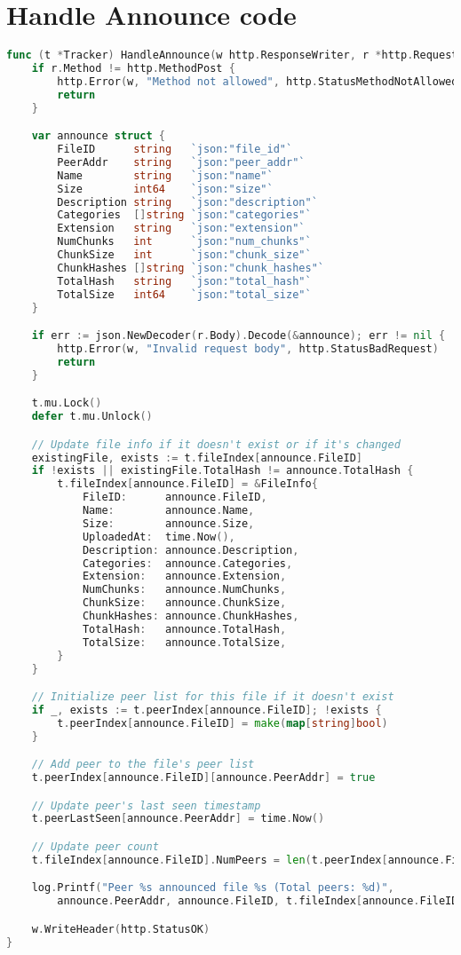 \documentclass[12pt,a4paper]{report}
\begin{document}
\section{Handle Announce code}
\begin{lstlisting}[language=Go, caption={Peer announce implementation}, label={lst:handle-announce}]
  func (t *Tracker) HandleAnnounce(w http.ResponseWriter, r *http.Request) {
    if r.Method != http.MethodPost {
        http.Error(w, "Method not allowed", http.StatusMethodNotAllowed)
        return
    }

    var announce struct {
        FileID      string   `json:"file_id"`
        PeerAddr    string   `json:"peer_addr"`
        Name        string   `json:"name"`
        Size        int64    `json:"size"`
        Description string   `json:"description"`
        Categories  []string `json:"categories"`
        Extension   string   `json:"extension"`
        NumChunks   int      `json:"num_chunks"`
        ChunkSize   int      `json:"chunk_size"`
        ChunkHashes []string `json:"chunk_hashes"`
        TotalHash   string   `json:"total_hash"`
        TotalSize   int64    `json:"total_size"`
    }

    if err := json.NewDecoder(r.Body).Decode(&announce); err != nil {
        http.Error(w, "Invalid request body", http.StatusBadRequest)
        return
    }

    t.mu.Lock()
    defer t.mu.Unlock()

    // Update file info if it doesn't exist or if it's changed
    existingFile, exists := t.fileIndex[announce.FileID]
    if !exists || existingFile.TotalHash != announce.TotalHash {
        t.fileIndex[announce.FileID] = &FileInfo{
            FileID:      announce.FileID,
            Name:        announce.Name,
            Size:        announce.Size,
            UploadedAt:  time.Now(),
            Description: announce.Description,
            Categories:  announce.Categories,
            Extension:   announce.Extension,
            NumChunks:   announce.NumChunks,
            ChunkSize:   announce.ChunkSize,
            ChunkHashes: announce.ChunkHashes,
            TotalHash:   announce.TotalHash,
            TotalSize:   announce.TotalSize,
        }
    }

    // Initialize peer list for this file if it doesn't exist
    if _, exists := t.peerIndex[announce.FileID]; !exists {
        t.peerIndex[announce.FileID] = make(map[string]bool)
    }

    // Add peer to the file's peer list
    t.peerIndex[announce.FileID][announce.PeerAddr] = true

    // Update peer's last seen timestamp
    t.peerLastSeen[announce.PeerAddr] = time.Now()

    // Update peer count
    t.fileIndex[announce.FileID].NumPeers = len(t.peerIndex[announce.FileID])

    log.Printf("Peer %s announced file %s (Total peers: %d)",
        announce.PeerAddr, announce.FileID, t.fileIndex[announce.FileID].NumPeers)

    w.WriteHeader(http.StatusOK)
}
\end{lstlisting}
\end{document}
